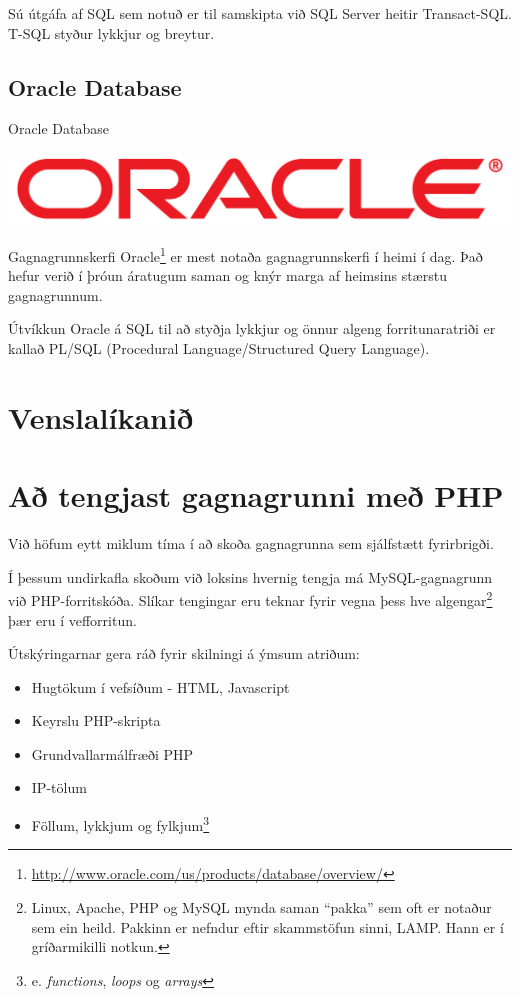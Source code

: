 Sú útgáfa af SQL sem notuð er til samskipta við SQL Server heitir Transact-SQL. T-SQL styður lykkjur og breytur.
\subsection{Oracle Database}
\label{undirkafli:oracle}
\begin{marginfigure}
\caption{Oracle Database}
\label{mynd:oracle}
\centering
\includegraphics[width=\linewidth]{myndir/oracle}
\end{marginfigure}
Gagnagrunnskerfi Oracle\footnote{\url{http://www.oracle.com/us/products/database/overview/}} er mest notaða gagnagrunnskerfi í heimi í dag. Það hefur verið í þróun áratugum saman og knýr marga af heimsins stærstu gagnagrunnum.

Útvíkkun Oracle á SQL til að styðja lykkjur og önnur algeng forritunaratriði er kallað PL/SQL (Procedural Language/Structured Query Language).
\section{Venslalíkanið}
\section{Að tengjast gagnagrunni með PHP}
\label{undirkafli:php}
Við höfum eytt miklum tíma í að skoða gagnagrunna sem sjálfstætt fyrirbrigði.

Í þessum undirkafla skoðum við loksins hvernig tengja má MySQL-gagnagrunn við PHP-forritskóða.
Slíkar tengingar eru teknar fyrir vegna þess hve algengar\footnote{Linux, Apache, PHP og MySQL mynda saman ``pakka'' sem oft er notaður sem ein heild. Pakkinn er nefndur eftir skammstöfun sinni, LAMP. Hann er í gríðarmikilli notkun.} þær eru í vefforritun.

Útskýringarnar gera ráð fyrir skilningi á ýmsum atriðum:
\begin{itemize}
 \item Hugtökum í vefsíðum - HTML, Javascript
 \item Keyrslu PHP-skripta
 \item Grundvallarmálfræði PHP
 \item IP-tölum
 \item Föllum, lykkjum og fylkjum\footnote{e. \emph{functions}, \emph{loops} og \emph{arrays}}
\end{itemize}
